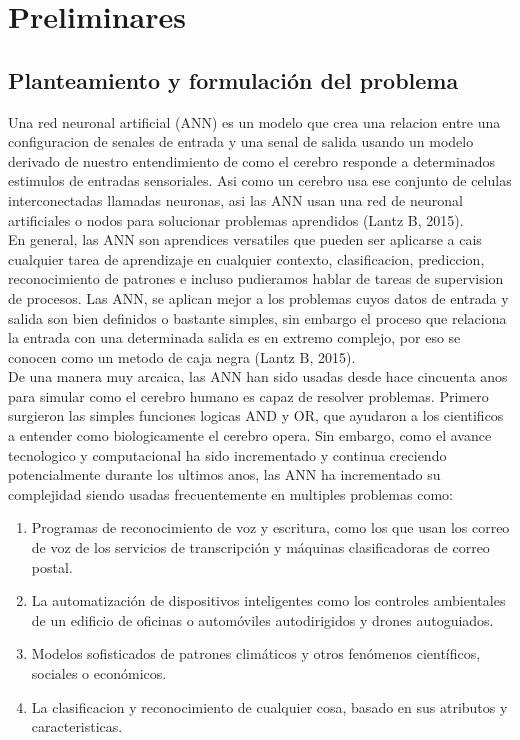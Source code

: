 \chapter{Preliminares}

\section{Planteamiento y formulaci\'on del problema}

Una red neuronal artificial (ANN) es un modelo que crea una relacion entre una configuracion de senales de entrada y una senal de salida usando un modelo derivado de nuestro entendimiento de como el cerebro responde a determinados estimulos de entradas sensoriales. Asi como un cerebro usa ese conjunto de celulas interconectadas llamadas neuronas, asi las ANN usan una red de neuronal artificiales o nodos para solucionar problemas aprendidos (Lantz B, 2015).\\

En general, las ANN son aprendices versatiles que pueden ser aplicarse a cais cualquier tarea de aprendizaje en cualquier contexto, clasificacion, prediccion, reconocimiento de patrones e incluso pudieramos hablar de tareas de supervision de procesos. Las ANN, se aplican mejor a los problemas cuyos datos de entrada y salida son bien definidos o bastante simples, sin embargo el proceso que relaciona la entrada con una determinada salida es en extremo complejo, por eso se conocen como un metodo de caja negra (Lantz B, 2015).\\

De una manera muy arcaica, las ANN han sido usadas desde hace cincuenta anos para simular como el cerebro humano es capaz de resolver problemas. Primero surgieron las simples funciones logicas AND y OR, que ayudaron a los cientificos a entender como biologicamente el cerebro opera. Sin embargo, como el avance tecnologico y computacional ha sido incrementado y continua creciendo potencialmente durante los ultimos anos, las ANN ha incrementado su complejidad siendo usadas frecuentemente en multiples problemas como:

\begin{enumerate}
    \item{Programas de reconocimiento de voz y escritura, como los que usan los correo de voz
de los servicios de transcripción y máquinas clasificadoras de correo postal.}
	\item{La automatización de dispositivos inteligentes como los controles ambientales de un edificio de oficinas o automóviles autodirigidos y drones autoguiados.}
	\item{Modelos sofisticados de patrones climáticos y otros fenómenos científicos, sociales o económicos.}
	\item{La clasificacion y reconocimiento de cualquier cosa, basado en sus atributos y caracteristicas.}
\end{enumerate} 

